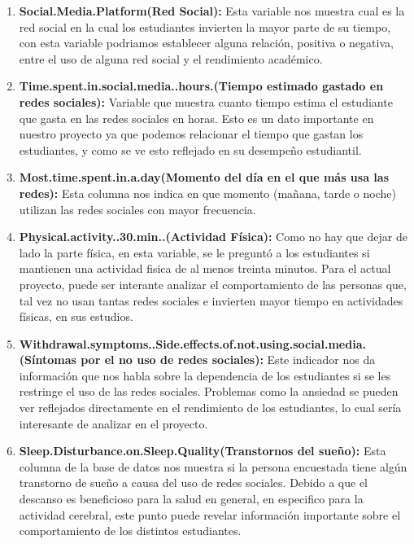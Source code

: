 \documentclass[12pt]{article}
\begin{document}
\begin{enumerate}
    \item \textbf{Social.Media.Platform(Red Social):} Esta variable nos muestra cual es la 
    red social en la cual los estudiantes invierten la mayor parte de su tiempo, con esta variable podriamos establecer alguna relación, positiva o negativa, entre el uso de alguna red social y el rendimiento académico.
    
    \item \textbf{Time.spent.in.social.media..hours.(Tiempo estimado gastado en redes sociales):} Variable que muestra cuanto tiempo estima el estudiante que gasta en las redes sociales en horas. Esto es un dato importante en nuestro proyecto ya que podemos relacionar el tiempo que gastan los estudiantes, y como se ve esto reflejado en su desempeño estudiantil.
    
    \item \textbf{Most.time.spent.in.a.day(Momento del día en el que más usa las redes):} Esta columna nos indica en que momento (mañana, tarde o noche) utilizan las redes sociales con mayor frecuencia.
    
    \item \textbf{Physical.activity..30.min..(Actividad Física):} Como no hay que dejar de lado la parte física, en esta variable, se le preguntó a los estudiantes si mantienen una actividad fisica de al menos treinta minutos. Para el actual proyecto, puede ser interante analizar el comportamiento de las personas que, tal vez no usan tantas redes sociales e invierten mayor tiempo en actividades físicas, en sus estudios.
    
    \item \textbf{Withdrawal.symptoms..Side.effects.of.not.using.social.media.(Síntomas por el no uso de redes sociales):} Este indicador nos da información que nos habla sobre la dependencia de los estudiantes si se les restringe el uso de las redes sociales. Problemas como la ansiedad se pueden ver reflejados directamente en el rendimiento de los estudiantes, lo cual sería interesante de analizar en el proyecto.
    
    \item \textbf{Sleep.Disturbance.on.Sleep.Quality(Transtornos del sueño):} Esta columna de la base de datos nos muestra si la persona encuestada tiene algún transtorno de sueño a causa del uso de redes sociales. Debido a que el descanso es beneficioso para la salud en general, en especifico para la actividad cerebral, este punto puede revelar información importante sobre el comportamiento de los distintos estudiantes.
    

\end{enumerate}
\end{document}
